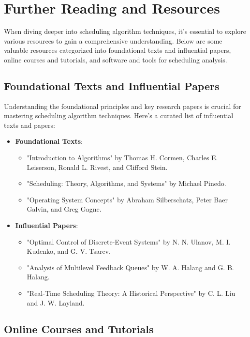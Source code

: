\documentclass[12pt]{book} %
\begin{document}
\section{Further Reading and Resources}

When diving deeper into scheduling algorithm techniques, it's essential to explore various resources to gain a comprehensive understanding. Below are some valuable resources categorized into foundational texts and influential papers, online courses and tutorials, and software and tools for scheduling analysis.

\subsection{Foundational Texts and Influential Papers}

Understanding the foundational principles and key research papers is crucial for mastering scheduling algorithm techniques. Here's a curated list of influential texts and papers:

\begin{itemize}
    \item \textbf{Foundational Texts}:
    \begin{itemize}
        \item "Introduction to Algorithms" by Thomas H. Cormen, Charles E. Leiserson, Ronald L. Rivest, and Clifford Stein.
        \item "Scheduling: Theory, Algorithms, and Systems" by Michael Pinedo.
        \item "Operating System Concepts" by Abraham Silberschatz, Peter Baer Galvin, and Greg Gagne.
    \end{itemize}
    
    \item \textbf{Influential Papers}:
    \begin{itemize}
        \item "Optimal Control of Discrete-Event Systems" by N. N. Ulanov, M. I. Kudenko, and G. V. Tsarev.
        \item "Analysis of Multilevel Feedback Queues" by W. A. Halang and G. B. Halang.
        \item "Real-Time Scheduling Theory: A Historical Perspective" by C. L. Liu and J. W. Layland.
    \end{itemize}
\end{itemize}

\subsection{Online Courses and Tutorials}
\end{document}
